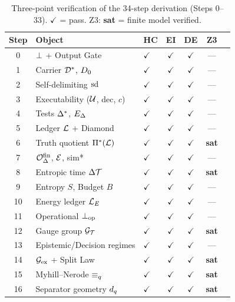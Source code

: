 \begin{table}[t]
\centering
\small
\caption{Three-point verification of the 34-step derivation (Steps 0--33).
$\checkmark$ = pass.  Z3: \textbf{sat} = finite model verified.}
\label{tab:audit-results}
\begin{tabular}{@{}cllcccc@{}}
\toprule
\textbf{Step} & \textbf{Object} & \textbf{HC} & \textbf{EI} & \textbf{DE} & \textbf{Z3} \\
\midrule
0  & $\bot$ + Output Gate       & $\checkmark$ & $\checkmark$ & $\checkmark$ & --- \\
1  & Carrier $\mathcal{D}^*$, $D_0$ & $\checkmark$ & $\checkmark$ & $\checkmark$ & --- \\
2  & Self-delimiting $\mathrm{sd}$    & $\checkmark$ & $\checkmark$ & $\checkmark$ & --- \\
3  & Executability ($\mathcal{U}$, dec, $c$)  & $\checkmark$ & $\checkmark$ & $\checkmark$ & --- \\
4  & Tests $\Delta^*$, $E_\Delta$  & $\checkmark$ & $\checkmark$ & $\checkmark$ & --- \\
\midrule
5  & Ledger $\mathcal{L}$ + Diamond  & $\checkmark$ & $\checkmark$ & $\checkmark$ & --- \\
6  & Truth quotient $\Pi^*(\mathcal{L})$ & $\checkmark$ & $\checkmark$ & $\checkmark$ & \textbf{sat} \\
7  & $\mathcal{O}^{\mathrm{fin}}_\Delta$, $\mathcal{E}$, sim* & $\checkmark$ & $\checkmark$ & $\checkmark$ & --- \\
\midrule
8  & Entropic time $\Delta\mathcal{T}$    & $\checkmark$ & $\checkmark$ & $\checkmark$ & \textbf{sat} \\
9  & Entropy $S$, Budget $B$     & $\checkmark$ & $\checkmark$ & $\checkmark$ & --- \\
10 & Energy ledger $\mathcal{L}_E$ & $\checkmark$ & $\checkmark$ & $\checkmark$ & --- \\
11 & Operational $\bot_{\mathrm{op}}$       & $\checkmark$ & $\checkmark$ & $\checkmark$ & --- \\
\midrule
12 & Gauge group $\mathcal{G}_{\mathcal{T}}$         & $\checkmark$ & $\checkmark$ & $\checkmark$ & \textbf{sat} \\
13 & Epistemic/Decision regimes  & $\checkmark$ & $\checkmark$ & $\checkmark$ & --- \\
14 & $\mathcal{G}_{\mathrm{ex}}$ + Split Law    & $\checkmark$ & $\checkmark$ & $\checkmark$ & \textbf{sat} \\
15 & Myhill--Nerode $\equiv_q$    & $\checkmark$ & $\checkmark$ & $\checkmark$ & \textbf{sat} \\
16 & Separator geometry $d_q$ & $\checkmark$ & $\checkmark$ & $\checkmark$ & \textbf{sat} \\

\end{tabular}
\end{table}
